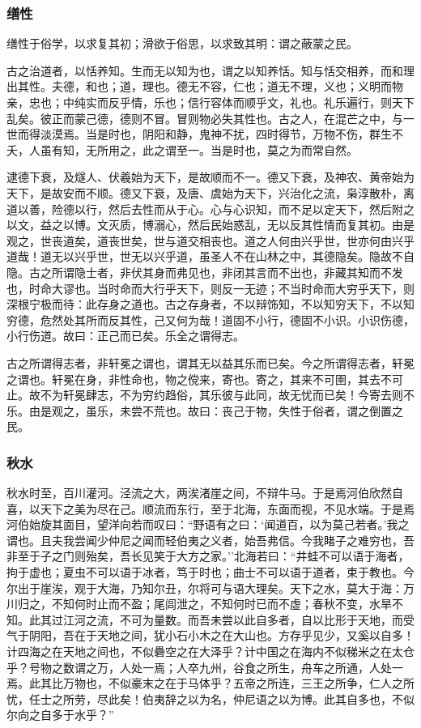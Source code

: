 \documentclass[]{article}
\begin{document}
\hypertarget{header-n283}{%
\subsubsection{缮性}\label{header-n283}}

缮性于俗学，以求复其初；滑欲于俗思，以求致其明：谓之蔽蒙之民。

古之治道者，以恬养知。生而无以知为也，谓之以知养恬。知与恬交相养，而和理出其性。夫德，和也；道，理也。德无不容，仁也；道无不理，义也；义明而物亲，忠也；中纯实而反乎情，乐也；信行容体而顺乎文，礼也。礼乐遍行，则天下乱矣。彼正而蒙己德，德则不冒。冒则物必失其性也。古之人，在混芒之中，与一世而得淡漠焉。当是时也，阴阳和静，鬼神不扰，四时得节，万物不伤，群生不夭，人虽有知，无所用之，此之谓至一。当是时也，莫之为而常自然。

逮德下衰，及燧人、伏羲始为天下，是故顺而不一。德又下衰，及神农、黄帝始为天下，是故安而不顺。德又下衰，及唐、虞始为天下，兴治化之流，枭淳散朴，离道以善，险德以行，然后去性而从于心。心与心识知，而不足以定天下，然后附之以文，益之以博。文灭质，博溺心，然后民始惑乱，无以反其性情而复其初。由是观之，世丧道矣，道丧世矣，世与道交相丧也。道之人何由兴乎世，世亦何由兴乎道哉！道无以兴乎世，世无以兴乎道，虽圣人不在山林之中，其德隐矣。隐故不自隐。古之所谓隐士者，非伏其身而弗见也，非闭其言而不出也，非藏其知而不发也，时命大谬也。当时命而大行乎天下，则反一无迹；不当时命而大穷乎天下，则深根宁极而待：此存身之道也。古之存身者，不以辩饰知，不以知穷天下，不以知穷德，危然处其所而反其性，己又何为哉！道固不小行，德固不小识。小识伤德，小行伤道。故曰：正己而已矣。乐全之谓得志。

古之所谓得志者，非轩冕之谓也，谓其无以益其乐而已矣。今之所谓得志者，轩冕之谓也。轩冕在身，非性命也，物之傥来，寄也。寄之，其来不可圉，其去不可止。故不为轩冕肆志，不为穷约趋俗，其乐彼与此同，故无忧而已矣！今寄去则不乐。由是观之，虽乐，未尝不荒也。故曰：丧己于物，失性于俗者，谓之倒置之民。

\hypertarget{header-n291}{%
\subsubsection{秋水}\label{header-n291}}

秋水时至，百川灌河。泾流之大，两涘渚崖之间，不辩牛马。于是焉河伯欣然自喜，以天下之美为尽在己。顺流而东行，至于北海，东面而视，不见水端。于是焉河伯始旋其面目，望洋向若而叹曰：``野语有之曰：`闻道百，以为莫己若者。'我之谓也。且夫我尝闻少仲尼之闻而轻伯夷之义者，始吾弗信。今我睹子之难穷也，吾非至于子之门则殆矣，吾长见笑于大方之家。''北海若曰：``井蛙不可以语于海者，拘于虚也；夏虫不可以语于冰者，笃于时也；曲士不可以语于道者，束于教也。今尔出于崖涘，观于大海，乃知尔丑，尔将可与语大理矣。天下之水，莫大于海：万川归之，不知何时止而不盈；尾闾泄之，不知何时已而不虚；春秋不变，水旱不知。此其过江河之流，不可为量数。而吾未尝以此自多者，自以比形于天地，而受气于阴阳，吾在于天地之间，犹小石小木之在大山也。方存乎见少，又奚以自多！计四海之在天地之间也，不似礨空之在大泽乎？计中国之在海内不似稊米之在太仓乎？号物之数谓之万，人处一焉；人卒九州，谷食之所生，舟车之所通，人处一焉。此其比万物也，不似豪末之在于马体乎？五帝之所连，三王之所争，仁人之所忧，任士之所劳，尽此矣！伯夷辞之以为名，仲尼语之以为博。此其自多也，不似尔向之自多于水乎？''
\end{document}
